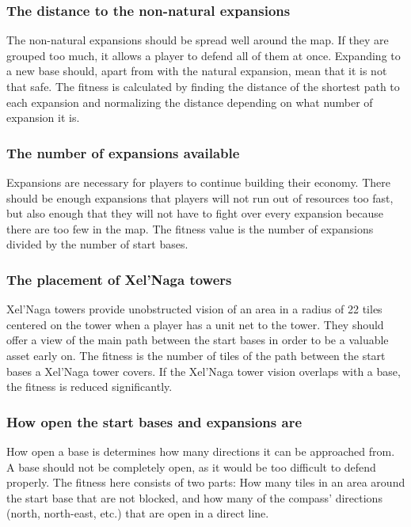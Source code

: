 	\subsubsection*{The distance to the non-natural expansions}
	The non-natural expansions should be spread well around the map. If they are grouped too much, it allows a player to defend all of them at once. Expanding to a new base should, apart from with the natural expansion, mean that it is not that safe. The fitness is calculated by finding the distance of the shortest path to each expansion and normalizing the distance depending on what number of expansion it is.

	\subsubsection*{The number of expansions available}
	Expansions are necessary for players to continue building their economy. There should be enough expansions that players will not run out of resources too fast, but also enough that they will not have to fight over every expansion because there are too few in the map. The fitness value is the number of expansions divided by the number of start bases.

	\subsubsection*{The placement of Xel'Naga towers}
	Xel'Naga towers provide unobstructed vision of an area in a radius of 22 tiles centered on the tower when a player has a unit net to the tower. They should offer a view of the main path between the start bases in order to be a valuable asset early on. The fitness is the number of tiles of the path between the start bases a Xel'Naga tower covers. If the Xel'Naga tower vision overlaps with a base, the fitness is reduced significantly.

	\subsubsection*{How open the start bases and expansions are}
	How open a base is determines how many directions it can be approached from. A base should not be completely open, as it would be too difficult to defend properly. The fitness here consists of two parts: How many tiles in an area around the start base that are not blocked, and how many of the compass' directions (north, north-east, etc.) that are open in a direct line.

